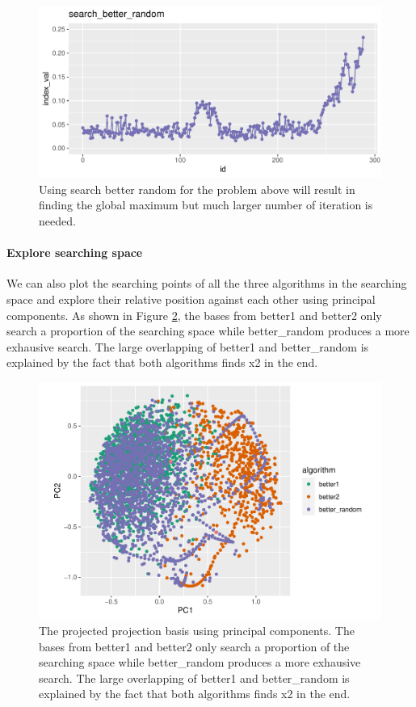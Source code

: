 \documentclass[12pt]{article}
\begin{document}
\begin{figure}
\centering
\includegraphics{paper_files/figure-latex/1d-2var-better-random-1.pdf}
\caption{\label{1d-2var-better-random}Using search better random for the
problem above will result in finding the global maximum but much larger
number of iteration is needed.}
\end{figure}

\hypertarget{explore-searching-space}{%
\paragraph{Explore searching space}\label{explore-searching-space}}

We can also plot the searching points of all the three algorithms in the
searching space and explore their relative position against each other
using principal components. As shown in Figure
\ref{1d-2var-explore-proj-pca}, the bases from better1 and better2 only
search a proportion of the searching space while better\_random produces
a more exhausive search. The large overlapping of better1 and
better\_random is explained by the fact that both algorithms finds x2 in
the end.

\begin{figure}
\centering
\includegraphics{paper_files/figure-latex/1d-2var-explore-proj-pca-1.pdf}
\caption{\label{1d-2var-explore-proj-pca} The projected projection basis
using principal components. The bases from better1 and better2 only
search a proportion of the searching space while better\_random produces
a more exhausive search. The large overlapping of better1 and
better\_random is explained by the fact that both algorithms finds x2 in
the end.}
\end{figure}
\end{document}
